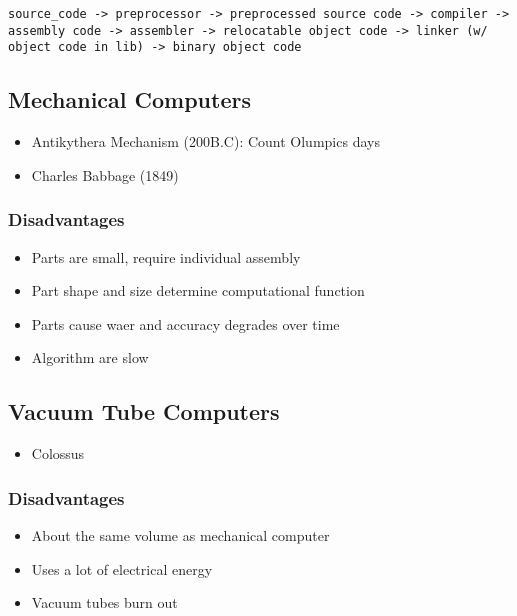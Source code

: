 \documentclass[11pt]{article}
\begin{document}
\begin{verbatim}
source_code -> preprocessor -> preprocessed source code -> compiler -> assembly code -> assembler -> relocatable object code -> linker (w/ object code in lib) -> binary object code
\end{verbatim}

\subsection{Mechanical Computers}
\label{sec:org3c16917}

\begin{itemize}
\item Antikythera Mechanism (200B.C): Count Olumpics days
\item Charles Babbage (1849)
\end{itemize}

\subsubsection{Disadvantages}
\label{sec:orgf460e20}

\begin{itemize}
\item Parts are small, require individual assembly
\item Part shape and size determine computational function
\item Parts cause waer and accuracy degrades over time
\item Algorithm are slow
\end{itemize}

\subsection{Vacuum Tube Computers}
\label{sec:orgad836db}

\begin{itemize}
\item Colossus
\end{itemize}

\subsubsection{Disadvantages}
\label{sec:org2814d9c}

\begin{itemize}
\item About the same volume as mechanical computer
\item Uses a lot of electrical energy
\item Vacuum tubes burn out
\end{itemize}
\end{document}
